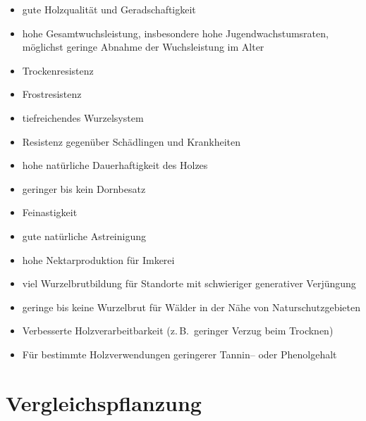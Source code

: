 \documentclass[twocolumn]{scrartcl}
\begin{document}
\begin{itemize}
  \item gute Holzqualität und Geradschaftigkeit
  \item hohe Gesamtwuchsleistung, insbesondere hohe Jugendwachstumsraten, möglichst geringe Abnahme der Wuchsleistung im Alter
  \item Trockenresistenz
  \item Frostresistenz
  \item tiefreichendes Wurzelsystem
  \item Resistenz gegenüber Schädlingen und Krankheiten
  \item hohe natürliche Dauerhaftigkeit des Holzes
  \item geringer bis kein Dornbesatz
  \item Feinastigkeit
  \item gute natürliche Astreinigung
  \item hohe Nektarproduktion für Imkerei
  \item viel Wurzelbrutbildung für Standorte mit schwieriger generativer Verjüngung
  \item geringe bis keine Wurzelbrut für Wälder in der Nähe von Naturschutzgebieten
  \item Verbesserte Holzverarbeitbarkeit (z.\,B.\ geringer Verzug beim Trocknen)
  \item Für bestimmte Holzverwendungen geringerer Tannin-- oder Phenolgehalt 
\end{itemize}

\section{Vergleichspflanzung}
\end{document}
